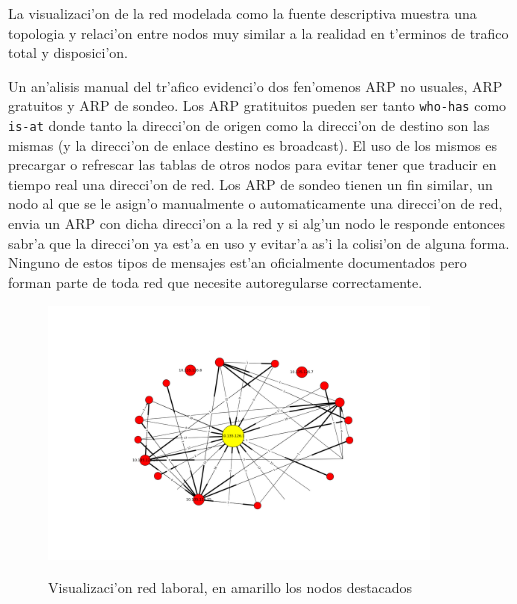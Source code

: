 La visualizaci'on de la red modelada como la fuente descriptiva muestra una topologia y relaci'on entre nodos muy similar
a la realidad en t'erminos de trafico total y disposici'on.


Un an'alisis manual del tr'afico evidenci'o dos fen'omenos ARP no usuales, ARP gratuitos y ARP de sondeo. Los ARP gratituitos pueden
ser tanto \texttt{who-has} como \texttt{is-at} donde tanto la direcci'on de origen como la direcci'on de destino son las mismas (y la direcci'on
de enlace destino es broadcast). El uso de los mismos es precargar o refrescar las tablas de otros nodos para evitar tener
que traducir en tiempo real una direcci'on de red. Los ARP de sondeo tienen un fin similar, un nodo al que se le asign'o manualmente
o automaticamente una direcci'on de red, envia un ARP con dicha direcci'on a la red y si alg'un nodo le responde entonces sabr'a
que la direcci'on ya est'a en uso y evitar'a as'i la colisi'on de alguna forma. Ninguno de estos tipos de mensajes est'an oficialmente
documentados pero forman parte de toda red que necesite autoregularse correctamente.\\

\begin{figure}[!h]
\centering
\caption{Visualizaci'on red laboral, en amarillo los nodos destacados}
\includegraphics[width=0.9\textwidth]{red2_red}
 \label{fig:red2net}
\end{figure}
